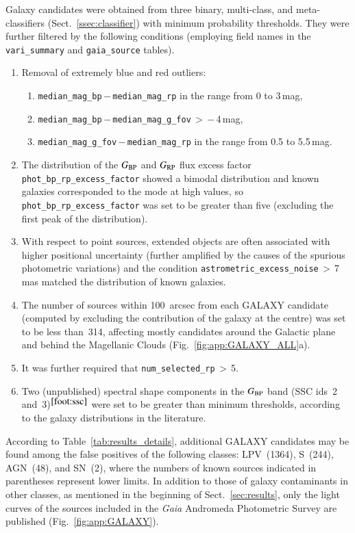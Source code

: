 \documentclass[longauth]{aa}
\def\gaia{\textit{Gaia}\xspace}
\def\bp{$G_{\rm BP}$\xspace}
\def\rp{$G_{\rm RP}$\xspace}
\begin{document}
Galaxy candidates were obtained from three binary, multi-class, and meta-classifiers (Sect.~\ref{ssec:classifier}) with minimum probability thresholds. They were further filtered by the following conditions (employing field names in the \texttt{vari\_summary} and \texttt{gaia\_source} tables).
\begin{enumerate}
    \item Removal of extremely blue and red outliers:
    \begin{enumerate}
        \item \texttt{median\_mag\_bp}\,$-$\,\texttt{median\_mag\_rp} in the range from 0 to 3\,mag,
         \item \texttt{median\_mag\_bp}\,$-$\,\texttt{median\_mag\_g\_fov}\,$>$\,$-$\,4\,mag,
         \item \texttt{median\_mag\_g\_fov}\,$-$\,\texttt{median\_mag\_rp} in the range from 0.5 to 5.5\,mag.
    \end{enumerate}
   \item The distribution of the \bp and \rp flux excess factor \texttt{phot\_bp\_rp\_excess\_factor}  showed a bimodal distribution and known galaxies corresponded to the mode at high values, so \texttt{phot\_bp\_rp\_excess\_factor}  was set to be greater than five (excluding the first peak of the distribution). 
    \item With respect to point sources, extended objects are often associated with higher positional uncertainty (further amplified by the causes of the spurious photometric variations) and the condition \texttt{astrometric\_excess\_noise}\,$>$\,7\,mas matched the distribution of known galaxies.
    \item The number of sources within 100~arcsec from each GALAXY candidate (computed by excluding the contribution of the galaxy at the centre) was set to be less than~314, affecting mostly candidates around the Galactic plane and behind the Magellanic Clouds (Fig.~\ref{fig:app:GALAXY_ALL}a).
    \item It was further required that \texttt{num\_selected\_rp}\,$>$\,5.
    \item Two (unpublished) spectral shape components in the \bp band (SSC ids~2 and~3)$^{\rm \ref{foot:ssc}}$ were set to be greater than minimum thresholds, according to the galaxy distributions in the literature. 
\end{enumerate}

According to Table~\ref{tab:results_details}, additional GALAXY candidates may be found among the false positives of the following classes: LPV~(1364), S~(244), AGN~(48), and SN~(2), where the numbers of known sources indicated in parentheses represent lower limits.
In addition to those of galaxy contaminants in other classes, as mentioned in the beginning of Sect.~\ref{sec:results}, only the light curves of the sources included in the \gaia Andromeda Photometric Survey \citep{DR3-DPACP-142} are published (Fig.~\ref{fig:app:GALAXY}).
\end{document}
